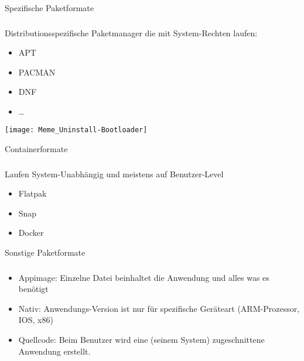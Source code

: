 \begin{frame}{Spezifische Paketformate}
    \subsubsection{}\label{subsubsec:spezifische-formate}

        Distributionsspezifische Paketmanager die mit System-Rechten laufen:
        \begin{itemize}
            \item<2-> APT
            \item<3-> PACMAN
            \item<4-> DNF
            \item<5-> \ldots
        \end{itemize}
    \endminipage\hfill
        \texttt{[image: Meme\_Uninstall-Bootloader]}
    \endminipage\hfill
\end{frame}

\begin{frame}{Containerformate}
    \subsubsection{}\label{subsubsec:containerformate}

    Laufen System-Unabhängig und meistens auf Benutzer-Level
    \pause

    \begin{itemize}
        \item Flatpak\pause
        \item Snap\pause
        \item Docker
    \end{itemize}

\end{frame}

\begin{frame}{Sonstige Paketformate}
    \subsubsection{}\label{subsubsec:sonstige-paketformate}

    \begin{itemize}
        \item Appimage: Einzelne Datei beinhaltet die Anwendung und alles was es benötigt\pause
        \item Nativ: Anwendungs-Version ist nur für spezifische Geräteart (ARM-Prozessor, IOS, x86)\pause
        \item Quellcode: Beim Benutzer wird eine (seinem System) zugeschnittene Anwendung erstellt.
    \end{itemize}

\end{frame}

